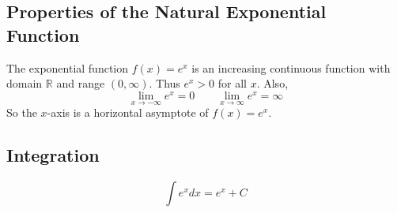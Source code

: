 \subsection*{Properties of the Natural Exponential Function}

The exponential function \( f(x)=e^x \) is an increasing continuous function with domain \( \mathbb{R} \) and range \( (0, \infty) \). Thus \( e^x > 0 \) for all \(x\). Also, 
\[ \lim_{x \to -\infty}{e^x} = 0 \quad \quad \lim_{x \to \infty}{e^x} = \infty \]
So the \(x\)-axis is a horizontal asymptote of \(f(x)=e^x\).

\subsection*{Integration}

\[ \int{e^x dx} = e^x + C \]
